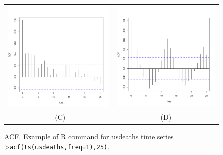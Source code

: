 \documentclass[a4paper,11pt,oneside,onecolumn]{book}
\begin{document}
\begin{figure}[!h]
\begin{tabular}{cc}
\includegraphics[width=.5\linewidth]{ cowtempACF}&\includegraphics[width=.5\linewidth]{ usdeathsACF}\\\
(C) & (D)\\
\end{tabular}
\caption{ACF. Example of R command for usdeaths time series >\texttt{acf(ts(usdeaths,freq=1),25)}.}\label{fig:ex:acf}
\end{figure}
\end{document}
